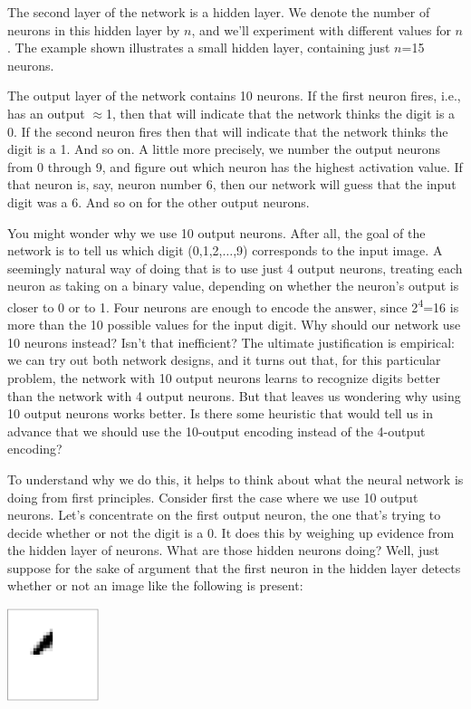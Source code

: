 The second layer of the network is a hidden layer. We denote the number of neurons in this hidden layer by $n$, and we'll experiment with different values for $n$. The example shown illustrates a small hidden layer, containing just $n$=15 neurons.

The output layer of the network contains 10 neurons. If the first neuron fires, i.e., has an output $\approx$1, then that will indicate that the network thinks the digit is a 0. If the second neuron fires then that will indicate that the network thinks the digit is a 1. And so on. A little more precisely, we number the output neurons from 0 through 9, and figure out which neuron has the highest activation value. If that neuron is, say, neuron number 6, then our network will guess that the input digit was a 6. And so on for the other output neurons.

You might wonder why we use 10 output neurons. After all, the goal of the network is to tell us which digit (0,1,2,$\ldots$,9) corresponds to the input image. A seemingly natural way of doing that is to use just 4 output neurons, treating each neuron as taking on a binary value, depending on whether the neuron's output is closer to 0 or to 1. Four neurons are enough to encode the answer, since 2\textsuperscript{4}=16 is more than the 10 possible values for the input digit. Why should our network use 10 neurons instead? Isn't that inefficient? The ultimate justification is empirical: we can try out both network designs, and it turns out that, for this particular problem, the network with 10 output neurons learns to recognize digits better than the network with 4 output neurons. But that leaves us wondering why using 10 output neurons works better. Is there some heuristic that would tell us in advance that we should use the 10-output encoding instead of the 4-output encoding?

To understand why we do this, it helps to think about what the neural network is doing from first principles. Consider first the case where we use 10 output neurons. Let's concentrate on the first output neuron, the one that's trying to decide whether or not the digit is a 0. It does this by weighing up evidence from the hidden layer of neurons. What are those hidden neurons doing? Well, just suppose for the sake of argument that the first neuron in the hidden layer detects whether or not an image like the following is present:

{\centering
\includegraphics[width=0.2\textwidth,]{pic/mnist_top_left_feature}
\par}

